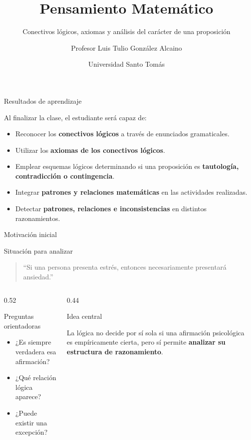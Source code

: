 \documentclass[aspectratio=169,10pt,handout]{beamer}
\title{Pensamiento Matemático}
\subtitle{Conectivos lógicos, axiomas y análisis del carácter de una proposición}
\author{Profesor Luis Tulio González Alcaino}
\institute{Primer año universitario -- Psicología}
\date{Universidad Santo Tomás}
\newcommand{\destacado}[1]{\textcolor{PsyPrimary}{\textbf{#1}}}
\newenvironment{IdeaClave}[1]
{
	\begin{block}{#1}
		\justifying
	}
	{
	\end{block}
}
\newenvironment{Alerta}[1]
{
	\begin{alertblock}{#1}
		\justifying
	}
	{
	\end{alertblock}
}
\newenvironment{Ejemplo}[1]
{
	\begin{exampleblock}{#1}
		\justifying
	}
	{
	\end{exampleblock}
}
\begin{document}
	
	\begin{frame}
		\titlepage
	\end{frame}
	
	\begin{frame}{Resultados de aprendizaje}
		\begin{IdeaClave}{Al finalizar la clase, el estudiante será capaz de:}
			\begin{itemize}[leftmargin=*,label=\textcolor{PsyAccent}{\large$\blacktriangleright$}]
				\item Reconocer los \destacado{conectivos lógicos} a través de enunciados gramaticales.
				\item Utilizar los \destacado{axiomas de los conectivos lógicos}.
				\item Emplear esquemas lógicos determinando si una proposición es \destacado{tautología, contradicción o contingencia}.
				\item Integrar \destacado{patrones y relaciones matemáticas} en las actividades realizadas.
				\item Detectar \destacado{patrones, relaciones e inconsistencias} en distintos razonamientos.
			\end{itemize}
		\end{IdeaClave}
	\end{frame}
	
	\begin{frame}{Motivación inicial}
		\begin{Alerta}{Situación para analizar}
			\begin{quote}
				``Si una persona presenta estrés, entonces necesariamente presentará ansiedad.''
			\end{quote}
		\end{Alerta}
		
		\pause
		
		\begin{columns}[T,totalwidth=\textwidth]
			\begin{column}{0.52\textwidth}
				\begin{IdeaClave}{Preguntas orientadoras}
					\begin{itemize}[leftmargin=*]
						\item ¿Es siempre verdadera esa afirmación?
						\item ¿Qué relación lógica aparece?
						\item ¿Puede existir una excepción?
					\end{itemize}
				\end{IdeaClave}
			\end{column}
			\begin{column}{0.44\textwidth}
				\begin{Ejemplo}{Idea central}
					La lógica no decide por sí sola si una afirmación psicológica es empíricamente cierta, pero sí permite \destacado{analizar su estructura de razonamiento}.
				\end{Ejemplo}
			\end{column}
		\end{columns}
	\end{frame}
	
\end{document}

